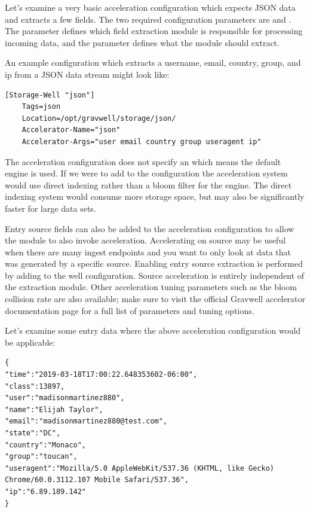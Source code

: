 {Let's examine a very basic acceleration configuration which expects
JSON data and extracts a few fields. The two required configuration
parameters are  and . The
 parameter defines which field extraction module is
responsible for processing incoming data, and the
 parameter defines what the module should extract.

An example configuration which extracts a username, email,
country, group, and ip from a JSON data stream might look
like:

\begin{Verbatim}[breaklines=true]
[Storage-Well "json"]
    Tags=json
    Location=/opt/gravwell/storage/json/
    Accelerator-Name="json"
    Accelerator-Args="user email country group useragent ip"
\end{Verbatim}

The acceleration configuration does not specify an
 which means the default engine 
 is used. If we were to add
 to the configuration the
acceleration system would use direct indexing rather than a bloom filter
for the engine. The direct indexing system would consume more storage
space, but may also be significantly faster for large data sets.

Entry source fields can also be added to the acceleration configuration
to allow the  module to also invoke acceleration. Accelerating
on source may be useful when there are many ingest endpoints and you
want to only look at data that was generated by a specific source.
Enabling entry source extraction is performed by adding
 to the well configuration. Source
acceleration is entirely independent of the extraction module. Other
acceleration tuning parameters such as the bloom collision rate are also
available; make sure to visit the official Gravwell accelerator
documentation page for a full list of parameters and tuning options.

Let's examine some entry data where the above acceleration
configuration would be applicable:

\begin{Verbatim}[breaklines=true]
{
"time":"2019-03-18T17:00:22.648353602-06:00",
"class":13897,
"user":"madisonmartinez880",
"name":"Elijah Taylor",
"email":"madisonmartinez880@test.com",
"state":"DC",
"country":"Monaco",
"group":"toucan",
"useragent":"Mozilla/5.0 AppleWebKit/537.36 (KHTML, like Gecko) 
Chrome/60.0.3112.107 Mobile Safari/537.36",
"ip":"6.89.189.142"
}
\end{Verbatim}

}
